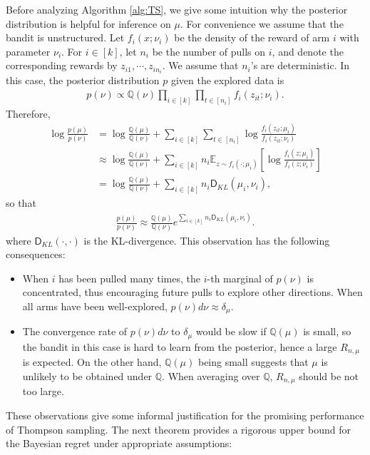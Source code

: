 \documentclass[letterpaper,11pt,openright,openany]{book}
\numberwithin{equation}{section}
\theoremstyle{plain}
\theoremstyle{definition}
\def\Q{{\mathbb Q}}
\def\E{{\mathbb E}}
\begin{document}
Before analyzing Algorithm \ref{alg:TS}, we give some intuition why the posterior distribution is helpful for inference on $\mu$. For convenience we assume that the bandit is unstructured. Let $f_i(x;\nu_i)$ be the density of the reward of arm $i$ with parameter $\nu_i$. For $i\in [k]$, let $n_i$ be the number of pulls on $i$, and denote the corresponding rewards by $z_{i1}, \cdots, z_{in_i}$. We assume that $n_i$'s are deterministic. In this case, the posterior distribution $p$ given the explored data is
\begin{align*}
p(\nu)\propto\Q(\nu)\prod_{i\in [k]}\prod_{t\in [n_i]}f_i(z_{it};\nu_i).
\end{align*}
Therefore, 
\begin{align*}
\log\frac{p(\mu)}{p(\nu)} &= \log\frac{\Q(\mu)}{\Q(\nu)}+\sum_{i\in [k]}\sum_{t\in [n_i]}\log\frac{f_i(z_{it};\mu_i)}{f_i(z_{it};\nu_i)}\\
& \approx \log\frac{\Q(\mu)}{\Q(\nu)}+\sum_{i\in [k]}n_i\E_{z\sim f_i(\cdot; \mu_i)}\left[\log\frac{f_i(z;\mu_i)}{f_i(z;\nu_i)}\right]\\
& =  \log\frac{\Q(\mu)}{\Q(\nu)}+\sum_{i\in [k]}n_i\mathsf D_{KL}(\mu_i, \nu_i),
\end{align*}
so that
\begin{align*}
\frac{p(\mu)}{p(\nu)} \approx \frac{\Q(\mu)}{\Q(\nu)}e^{\sum_{i\in [k]}n_i\mathsf D_{KL}(\mu_i, \nu_i)}.
\end{align*}
where $\mathsf D_{KL}(\cdot, \cdot)$ is the KL-divergence. This observation has the following consequences:
\begin{itemize}
\item When $i$ has been pulled many times, the $i$-th marginal of $p(\nu)$ is concentrated, thus encouraging future pulls to explore other directions. When all arms have been well-explored, $p(\nu)d\nu\approx\delta_{\mu}$.

\item The convergence rate of $p(\nu)d\nu$ to $\delta_{\mu}$ would be slow if $\Q(\mu)$ is small, so the bandit in this case is hard to learn from the posterior, hence a large $R_{n,\mu}$ is expected. On the other hand, $\Q(\mu)$ being small suggests that $\mu$ is unlikely to be obtained under $\Q$. When averaging over $\Q$, $R_{n,\mu}$ should be not too large. 
\end{itemize}

These observations give some informal justification for the promising performance of Thompson sampling. The next theorem provides a rigorous upper bound for the Bayesian regret under appropriate assumptions:
\end{document}
